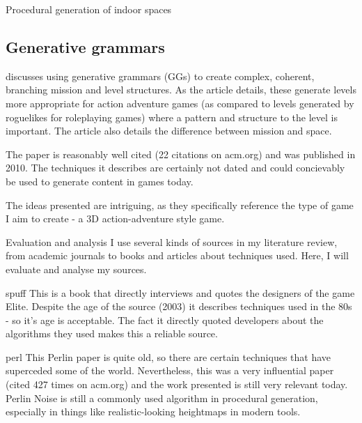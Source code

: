 \documentclass[review]{cmpreport}
\begin{document}
\begin{section}{Procedural generation of indoor spaces}
\subsection{Generative grammars}
\cite{Dormans:2010:ALD:1814256.1814257} discusses using generative grammars (GGs) to create complex, coherent, branching mission and level structures. As the article details, these generate levels more appropriate for action adventure games (as compared to levels generated by roguelikes for roleplaying games) where a pattern and structure to the level is important. The article also details the difference between mission and space. \par
The paper is reasonably well cited (22 citations on acm.org) and was published in 2010. The techniques it describes are certainly not dated and could concievably be used to generate content in games today. \par  
The ideas presented are intriguing, as they specifically reference the type of game I aim to create - a 3D action-adventure style game. 


\end{section}




\begin{section}{Evaluation and analysis}
I use several kinds of sources in my literature review, from academic journals to books and articles about techniques used. Here, I will evaluate and analyse my sources.

spuff
This is a book that directly interviews and quotes the designers of the game Elite. Despite the age of the source (2003) it describes techniques used in the 80s - so it's age is acceptable. The fact it directly quoted developers about the algorithms they used makes this a reliable source.

perl
This Perlin paper is quite old, so there are certain techniques that have superceded some of the world. Nevertheless, this was a very influential paper (cited 427 times on acm.org) and the work presented is still very relevant today. Perlin Noise is still a commonly used algorithm in procedural generation, especially in things like realistic-looking heightmaps in modern tools.



\end{section}



\end{document}
